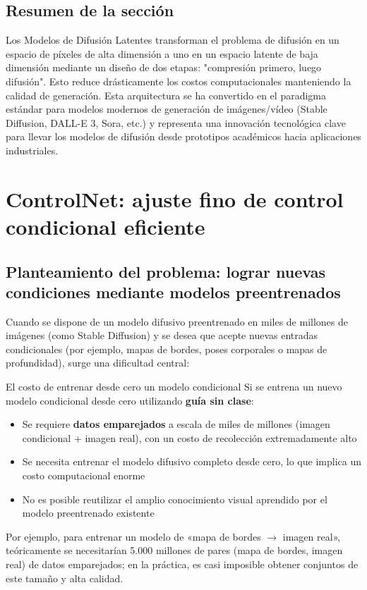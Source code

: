\documentclass[a4paper]{article}
\begin{document}
\subsection{Resumen de la sección}

Los Modelos de Difusión Latentes transforman el problema de difusión en un espacio de píxeles de alta dimensión a uno en un espacio latente de baja dimensión mediante un diseño de dos etapas: "compresión primero, luego difusión". Esto reduce drásticamente los costos computacionales manteniendo la calidad de generación. Esta arquitectura se ha convertido en el paradigma estándar para modelos modernos de generación de imágenes/vídeo (Stable Diffusion, DALL-E 3, Sora, etc.) y representa una innovación tecnológica clave para llevar los modelos de difusión desde prototipos académicos hacia aplicaciones industriales.

\newpage
\section{ControlNet: ajuste fino de control condicional eficiente}

\subsection{Planteamiento del problema: lograr nuevas condiciones mediante modelos preentrenados}

Cuando se dispone de un modelo difusivo preentrenado en miles de millones de imágenes (como Stable Diffusion) y se desea que acepte nuevas entradas condicionales (por ejemplo, mapas de bordes, poses corporales o mapas de profundidad), surge una dificultad central:

\begin{warningbox}{El costo de entrenar desde cero un modelo condicional}
Si se entrena un nuevo modelo condicional desde cero utilizando \textbf{guía sin clase}:
\begin{itemize}
    \item Se requiere \textbf{datos emparejados} a escala de miles de millones (imagen condicional + imagen real), con un costo de recolección extremadamente alto
    \item Se necesita entrenar el modelo difusivo completo desde cero, lo que implica un costo computacional enorme
    \item No es posible reutilizar el amplio conocimiento visual aprendido por el modelo preentrenado existente
\end{itemize}
Por ejemplo, para entrenar un modelo de «mapa de bordes $\to$ imagen real», teóricamente se necesitarían 5.000 millones de pares (mapa de bordes, imagen real) de datos emparejados; en la práctica, es casi imposible obtener conjuntos de este tamaño y alta calidad.
\end{warningbox}
\end{document}
